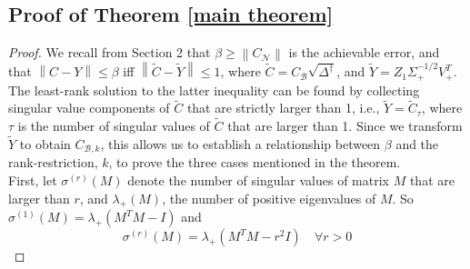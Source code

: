 \documentclass[11pt]{article}
\newcommand{\rank}{\operatorname{rank}}
\newcommand{\norm}[1]{\left\|#1\right\|}
\newcommand{\B}{\mathcal{B}}
\newcommand{\N}{\mathcal{N}}
\begin{document}
%
\subsection{Proof of Theorem \ref{main theorem}}
%
\begin{proof}
We recall from Section 2 that $\beta \geq \norm{C_{\N}}$ is the achievable error, and that $\norm{{C} - {Y}} \leq \beta$ iff $\norm{\tilde{C} - \tilde{Y}} \leq 1$,
%
where $\tilde{C} = C_{\B} \sqrt{\Delta^{\dagger}}$, and $\tilde{Y} = Z_1{\Sigma}^{-1/2}_+V_+^T$.
The least-rank solution to the latter inequality can be found by collecting singular value components of $\tilde{C}$ that are strictly larger than 1, i.e., $\tilde{Y} = \tilde{C}_{\tau}$, where $\tau$ is the number of singular values of $\tilde{C}$ that are larger than 1. Since we transform $\tilde Y$ to obtain $C_{\B, k}$, this allows us to establish a relationship between $\beta$ and the rank-restriction, $k$, to prove the three cases mentioned in the theorem.\\  
\noindent First, let $ \sigma^{(r)}(M)$ denote the  number of singular values of matrix $M$ that are larger than $r$, and $\lambda_{+}(M)$, the number of positive eigenvalues of $M$.
So $\sigma^{(1)}(M) = \lambda_{+}(M^TM - I)$ and
\[ \sigma^{(r)}(M) =  \lambda_{+}( M^TM - r^2 I) \quad \forall r > 0 \]
%

\end{proof}
\end{document}
